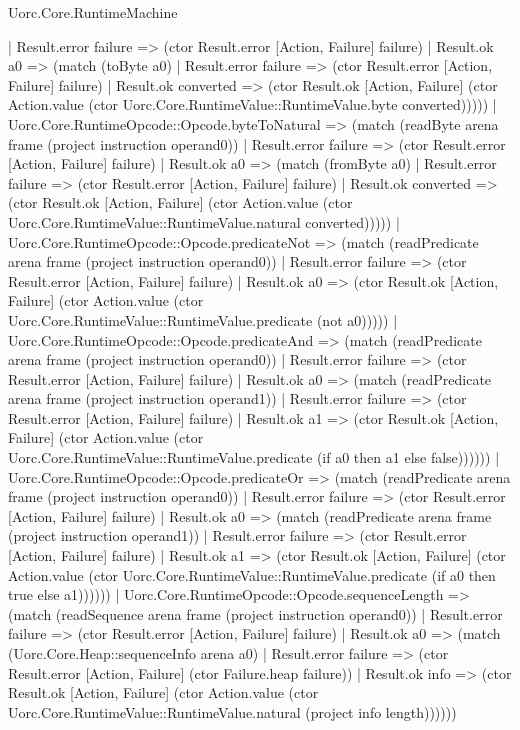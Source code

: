 \begin{lexlean}{Uorc.Core.RuntimeMachine}
\begin{semanticmodule}
{      | Result.error failure => (ctor Result.error [Action, Failure] failure)
      | Result.ok a0 => (match (toByte a0)
        | Result.error failure => (ctor Result.error [Action, Failure] failure)
        | Result.ok converted => (ctor Result.ok [Action, Failure] (ctor Action.value (ctor Uorc.Core.RuntimeValue::RuntimeValue.byte converted)))))
    | Uorc.Core.RuntimeOpcode::Opcode.byteToNatural => (match (readByte arena frame (project instruction operand0))
      | Result.error failure => (ctor Result.error [Action, Failure] failure)
      | Result.ok a0 => (match (fromByte a0)
        | Result.error failure => (ctor Result.error [Action, Failure] failure)
        | Result.ok converted => (ctor Result.ok [Action, Failure] (ctor Action.value (ctor Uorc.Core.RuntimeValue::RuntimeValue.natural converted)))))
    | Uorc.Core.RuntimeOpcode::Opcode.predicateNot => (match (readPredicate arena frame (project instruction operand0))
      | Result.error failure => (ctor Result.error [Action, Failure] failure)
      | Result.ok a0 => (ctor Result.ok [Action, Failure] (ctor Action.value (ctor Uorc.Core.RuntimeValue::RuntimeValue.predicate (not a0)))))
    | Uorc.Core.RuntimeOpcode::Opcode.predicateAnd => (match (readPredicate arena frame (project instruction operand0))
      | Result.error failure => (ctor Result.error [Action, Failure] failure)
      | Result.ok a0 => (match (readPredicate arena frame (project instruction operand1))
        | Result.error failure => (ctor Result.error [Action, Failure] failure)
        | Result.ok a1 => (ctor Result.ok [Action, Failure] (ctor Action.value (ctor Uorc.Core.RuntimeValue::RuntimeValue.predicate (if a0 then a1 else false))))))
    | Uorc.Core.RuntimeOpcode::Opcode.predicateOr => (match (readPredicate arena frame (project instruction operand0))
      | Result.error failure => (ctor Result.error [Action, Failure] failure)
      | Result.ok a0 => (match (readPredicate arena frame (project instruction operand1))
        | Result.error failure => (ctor Result.error [Action, Failure] failure)
        | Result.ok a1 => (ctor Result.ok [Action, Failure] (ctor Action.value (ctor Uorc.Core.RuntimeValue::RuntimeValue.predicate (if a0 then true else a1))))))
    | Uorc.Core.RuntimeOpcode::Opcode.sequenceLength => (match (readSequence arena frame (project instruction operand0))
      | Result.error failure => (ctor Result.error [Action, Failure] failure)
      | Result.ok a0 => (match (Uorc.Core.Heap::sequenceInfo arena a0)
        | Result.error failure => (ctor Result.error [Action, Failure] (ctor Failure.heap failure))
        | Result.ok info => (ctor Result.ok [Action, Failure] (ctor Action.value (ctor Uorc.Core.RuntimeValue::RuntimeValue.natural (project info length))))))
}
\end{semanticmodule}
\end{lexlean}
